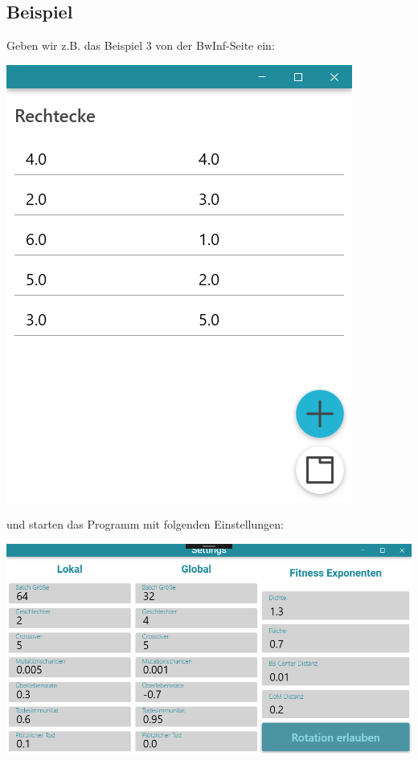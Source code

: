 \documentclass{article}
\begin{document}
\begin{flushleft}
\newpage
\subsection{Beispiel}
Geben wir z.B. das Beispiel 3 von der BwInf-Seite ein:\\
\begin{center}
\includegraphics[scale=.5]{schreber3}
\end{center}

und starten das Programm mit folgenden Einstellungen:
\begin{center}
\includegraphics[scale=.5]{schrebersettings}
\end{center}


\end{flushleft}
\end{document}
